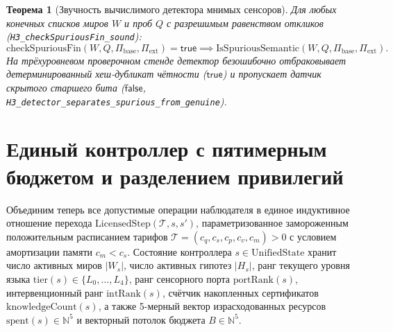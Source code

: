\documentclass[11pt,a4paper]{article}
\theoremstyle{cleanthm}
\newtheorem{theorem}{Теорема}[section]
\theoremstyle{cleandef}
\begin{document}
\begin{theorem}[Звучность вычислимого детектора мнимых сенсоров]
\label{thm:h3_spurious}
Для любых конечных списков миров $W$ и проб $Q$ с разрешимым равенством откликов (\texttt{H3\_checkSpuriousFin\_sound}):
\begin{equation}
  \mathrm{checkSpuriousFin}(W,Q,\Pi_{\mathrm{base}},\Pi_{\mathrm{ext}}) = \mathsf{true} \implies \mathrm{IsSpuriousSemantic}(W,Q,\Pi_{\mathrm{base}},\Pi_{\mathrm{ext}}).
\end{equation}
На трёхуровневом проверочном стенде детектор безошибочно отбраковывает детерминированный хеш-дубликат чётности ($\mathsf{true}$) и пропускает датчик скрытого старшего бита ($\mathsf{false}$, \texttt{H3\_detector\_\allowbreak separates\_\allowbreak spurious\_\allowbreak from\_\allowbreak genuine}).
\end{theorem}

\section{Единый контроллер с пятимерным бюджетом и разделением привилегий}

Объединим теперь все допустимые операции наблюдателя в единое индуктивное отношение перехода $\mathrm{LicensedStep}(\mathcal{T}, s, s')$, параметризованное замороженным положительным расписанием тарифов $\mathcal{T} = (c_q, c_s, c_p, c_v, c_m) > 0$ с условием амортизации памяти $c_m < c_s$. Состояние контроллера $s\in\mathrm{UnifiedState}$ хранит число активных миров $|W_s|$, число активных гипотез $|H_s|$, ранг текущего уровня языка $\mathrm{tier}(s)\in\{L_0,\dots,L_4\}$, ранг сенсорного порта $\mathrm{portRank}(s)$, интервенционный ранг $\mathrm{intRank}(s)$, счётчик накопленных сертификатов $\mathrm{knowledgeCount}(s)$, а также 5-мерный вектор израсходованных ресурсов $\mathrm{spent}(s)\in\mathbb{N}^5$ и векторный потолок бюджета $B\in\mathbb{N}^5$.
\end{document}
